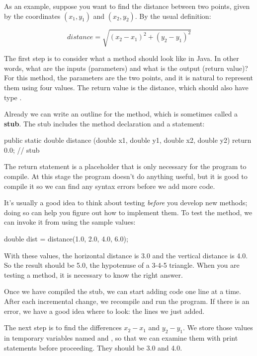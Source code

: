 As an example, suppose you want to find the distance between two points, given by the coordinates $(x_1, y_1)$ and $(x_2, y_2)$.
By the usual definition:

\[ distance = \sqrt{(x_2 - x_1)^2 +(y_2 - y_1)^2} \]

The first step is to consider what a  method should look like in Java.
In other words, what are the inputs (parameters) and what is the output (return value)?
For this method, the parameters are the two points, and it is natural to represent them using four  values.
The return value is the distance, which should also have type .


Already we can write an outline for the method, which is sometimes called a {\bf stub}.
The stub includes the method declaration and a  statement:

\begin{code}
public static double distance
        (double x1, double y1, double x2, double y2) {
    return 0.0;  // stub
}
\end{code}

The return statement is a placeholder that is only necessary for the program to compile.
At this stage the program doesn't do anything useful, but it is good to compile it so we can find any syntax errors before we add more code.

It's usually a good idea to think about testing {\em before} you develop new methods; doing so can help you figure out how to implement them.
To test the method, we can invoke it from  using the sample values:

\begin{code}
double dist = distance(1.0, 2.0, 4.0, 6.0);
\end{code}

With these values, the horizontal distance is 3.0 and the vertical distance is 4.0.
So the result should be 5.0, the hypotenuse of a 3-4-5 triangle.
When you are testing a method, it is necessary to know the right answer.

Once we have compiled the stub, we can start adding code one line at a time.
After each incremental change, we recompile and run the program.
If there is an error, we have a good idea where to look: the lines we just added.

The next step is to find the differences $x_2 - x_1$ and $y_2 - y_1$.
We store those values in temporary variables named  and , so that we can examine them with print statements before proceeding.
They should be 3.0 and 4.0.


